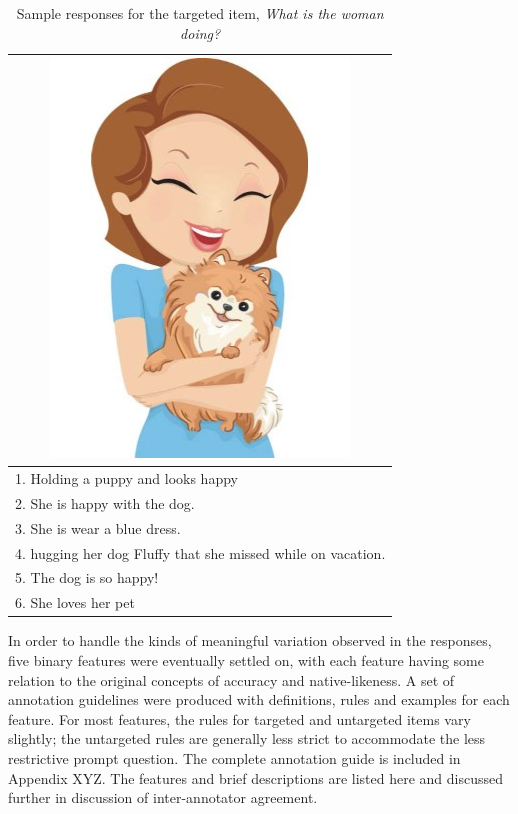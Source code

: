 \begin{table}[htb!]
\begin{center}
\begin{tabular}{|l|}
\hline
\multicolumn{1}{|c|}{\includegraphics[width=0.45\columnwidth]{figures/I29.jpg}} \\
\hline
1. Holding a puppy and looks happy \\
\hline
2. She is happy with the dog. \\
\hline
3. She is wear a blue dress. \\
\hline
4. hugging her dog Fluffy that she missed while on vacation. \\
\hline
5. The dog is so happy! \\
\hline
6. She loves her pet \\
\hline
\end{tabular}
\caption{\label{tab:sample-responses} Sample responses for the targeted item, \textit{What is the woman doing?}}
\end{center}
\end{table}

In order to handle the kinds of meaningful variation observed in the responses, five binary features were eventually settled on, with each feature having some relation to the original concepts of accuracy and native-likeness. A set of annotation guidelines were produced with definitions, rules and examples for each feature. For most features, the rules for targeted and untargeted items vary slightly; the untargeted rules are generally less strict to accommodate the less restrictive prompt question. The complete annotation guide is included in Appendix XYZ. The features and brief descriptions are listed here and discussed further in discussion of inter-annotator agreement.

